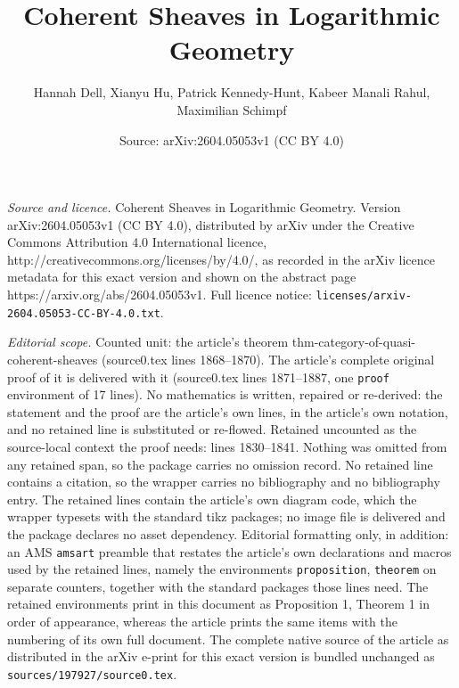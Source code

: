 \documentclass[10pt,a4paper]{amsart}
\title{Coherent Sheaves in Logarithmic Geometry}
\author{Hannah Dell, Xianyu Hu, Patrick Kennedy-Hunt, Kabeer Manali Rahul, Maximilian Schimpf}
\date{Source: arXiv:2604.05053v1 (CC BY 4.0)}
\begin{document}
\maketitle

\noindent\emph{Source and licence.} Coherent Sheaves in Logarithmic Geometry. Version arXiv:2604.05053v1 (CC BY 4.0), distributed by arXiv under the Creative Commons Attribution 4.0 International licence, http://creativecommons.org/licenses/by/4.0/, as recorded in the arXiv licence metadata for this exact version and shown on the abstract page https://arxiv.org/abs/2604.05053v1. Full licence notice: \texttt{licenses/arxiv-2604.05053-CC-BY-4.0.txt}.\par\smallskip

\noindent\textit{Editorial scope.} Counted unit: the article's theorem thm-category-of-quasi-coherent-sheaves (source0.tex lines 1868--1870). The article's complete original proof of it is delivered with it (source0.tex lines 1871--1887, one \texttt{proof} environment of 17 lines). No mathematics is written, repaired or re-derived: the statement and the proof are the article's own lines, in the article's own notation, and no retained line is substituted or re-flowed.  Retained uncounted as the source-local context the proof needs: lines 1830--1841.  Nothing was omitted from any retained span, so the package carries no omission record.  No retained line contains a citation, so the wrapper carries no bibliography and no bibliography entry.  The retained lines contain the article's own diagram code, which the wrapper typesets with the standard tikz packages; no image file is delivered and the package declares no asset dependency.  Editorial formatting only, in addition: an AMS \texttt{amsart} preamble that restates the article's own declarations and macros used by the retained lines, namely the environments \texttt{proposition}, \texttt{theorem} on separate counters, together with the standard packages those lines need.  The retained environments print in this document as Proposition 1, Theorem 1 in order of appearance, whereas the article prints the same items with the numbering of its own full document.  The complete native source of the article as distributed in the arXiv e-print for this exact version is bundled unchanged as \texttt{sources/197927/source0.tex}.
\end{document}
